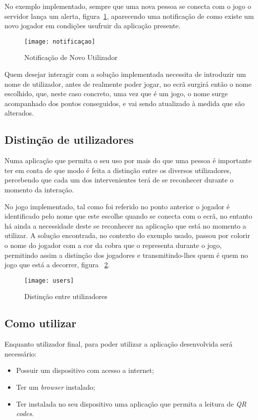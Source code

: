 	No exemplo implementado, sempre que uma nova pessoa se conecta com o jogo o servidor lança um alerta, figura~\ref{fig:novo}, aparecendo uma notificação de como existe um novo jogador em condições usufruir da aplicação presente. 
	
	\begin{figure}[ht]
		\centering
		\texttt{[image: notificaçao]}
		\caption[Novo Utilizador] {Notificação de Novo Utilizador}
		\label{fig:novo}
	\end{figure}

	Quem desejar interagir com a solução implementada necessita de introduzir um nome de utilizador, antes de realmente poder jogar, no ecrã surgirá então o nome escolhido, que, neste caso concreto, uma vez que é um jogo, o nome surge acompanhado dos pontos conseguidos, e vai sendo atualizado à medida que são alterados.
	

	\subsection{Distinção de utilizadores}

	Numa aplicação que permita o seu uso por mais do que uma pessoa é importante ter em conta de que modo é feita a distinção entre os diversos utilizadores, percebendo que cada um dos intervenientes terá de se reconhecer durante o momento da interação. 

	No jogo implementado, tal como foi referido no ponto anterior o jogador é identificado pelo nome que este escolhe quando se conecta com o ecrã, no entanto há ainda a necessidade deste se reconhecer na aplicação que está no momento a utilizar. A solução encontrada, no contexto do exemplo usado, passou por colorir o nome do jogador com a cor da cobra que o representa durante o jogo, permitindo assim a distinção dos jogadores e transmitindo-lhes quem é quem no jogo que está a decorrer, figura ~\ref{fig:user}.

	\begin{figure}[ht]
		\centering
		\texttt{[image: users]}
		\caption[Distinção de Utilizadores]{Distinção entre utilizadores}
		\label{fig:user}
	\end{figure}

	\subsection{Como utilizar}

	Enquanto utilizador final, para poder utilizar a aplicação desenvolvida será necessário:
	\begin{itemize}
		\item Possuir um dispositivo com acesso a internet;
		\item Ter um \textit{browser} instalado;
		\item Ter instalada no seu dispositivo uma aplicação que permita a leitura de \textit{QR codes}.
	\end{itemize}

